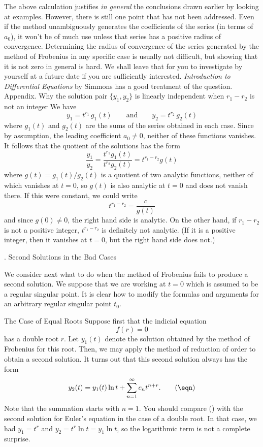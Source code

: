 The above calculation justifies {\it in general\/}
 the conclusions drawn earlier by
looking at examples.   However, there is still one point that has not
been addressed.  Even if the method unambiguously generates the coefficients
of the series (in terms of $a_0$), it won't be of much use unless that
series has a positive radius of convergence.  Determining the radius
of convergence of the series generated by the method of Frobenius 
in any specific case is
usually not difficult, but showing that it is not
zero in  general is hard.   We shall leave that for you to investigate
by yourself at a future date if you are sufficiently interested.
{\it Introduction to Differential Equations\/} by Simmons has a good
treatment of the question.
\bigskip
\subhead Appendix.  Why the solution pair $\{y_1, y_2\}$  is linearly
independent when $r_1 - r_2$ is not an integer \endsubhead
We have
$$
y_1 = t^{r_1}\,g_1(t)\qquad\text{and}\qquad y_2 = t^{r_2}\,g_2(t)
$$
where $g_1(t)$ and $g_2(t)$ are the sums of the series obtained
in each case.  Since by assumption, the leading coefficient $a_0
\not= 0$, neither of these functions vanishes.  It follows that
the quotient of the solutions has the form
$$
\frac {y_1}{y_2} = \frac{t^{r_1}g_1(t)}{t^{r_2}g_2(t)}
 = t^{r_1 - r_2}g(t)
$$
where $g(t) = g_1(t)/g_2(t)$ is a quotient of two analytic functions,
neither of which vanishes at $t = 0$, so $g(t)$ is also analytic
at $t= 0$ and does not vanish there.  If this were constant,
we could write
$$
t^{r_1 - r_2} = \frac c{g(t)}
$$
and since $g(0)\not= 0$, the right hand side is analytic.
  On the other hand, if $r_1 - r_2$ is not
a positive integer, $t^{r_1 - r_2}$ is definitely not analytic.
(If it is a positive integer, then it vanishes at $t = 0$,
but the right hand side does not.)

\bigskip

\bigskip

\head \sn. Second Solutions in the Bad Cases \endhead

We consider next what to do when the method of Frobenius
fails to produce a second solution.  We suppose that we
%
are working at $t = 0$ which is assumed to be a regular
singular point.   It is clear how to modify the formulas and
arguments for an arbitrary regular singular point $t_0$.
\medskip

\subhead  The Case of Equal Roots \endsubhead
Suppose first that the indicial equation
$$
  f(r) = 0
$$
has a double root $r$.   Let $y_1(t)$ denote the solution obtained
%
by the method of Frobenius for this root.   Then, we may apply
the method of reduction of order to obtain a second solution.
%
It turns out that this second solution always has the form
\nexteqn
\xdef\EqRootSol{\eqn}
$$
y_2(t) = y_1(t)\ln t + \sum_{n=1}^\infty c_nt^{n+r}.\tag\eqn
$$
Note that the summation starts with $n=1$.
You should compare (\eqn)  with the second solution for Euler's equation
in the
case of a double root.   In that case, we had $y_1 = t^r$ and
$y_2 = t^r\ln t = y_1\ln t$, so the logarithmic term is not a
complete surprise.

